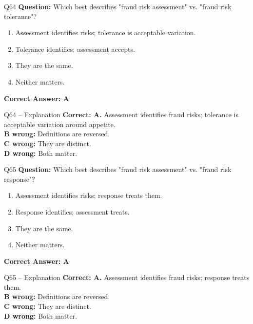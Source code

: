 \documentclass[aspectratio=169,10pt]{beamer}
\begin{document}
	\begin{frame}[t]{Q64}
		\small
		\textbf{Question:} Which best describes "fraud risk assessment" vs. "fraud risk tolerance"?
		\begin{enumerate}[label=\Alph*.,itemsep=1pt,topsep=2pt]
			\item Assessment identifies risks; tolerance is acceptable variation.
			\item Tolerance identifies; assessment accepts.
			\item They are the same.
			\item Neither matters.
		\end{enumerate}
		\vspace{4pt}
		\textbf{Correct Answer: A}
	\end{frame}
	
	\begin{frame}[t]{Q64 -- Explanation}
		\small
		\textbf{Correct: A.} Assessment identifies fraud risks; tolerance is acceptable variation around appetite. \\[4pt]
		\textbf{B wrong:} Definitions are reversed. \\[2pt]
		\textbf{C wrong:} They are distinct. \\[2pt]
		\textbf{D wrong:} Both matter.
	\end{frame}
	
	\begin{frame}[t]{Q65}
		\small
		\textbf{Question:} Which best describes "fraud risk assessment" vs. "fraud risk response"?
		\begin{enumerate}[label=\Alph*.,itemsep=1pt,topsep=2pt]
			\item Assessment identifies risks; response treats them.
			\item Response identifies; assessment treats.
			\item They are the same.
			\item Neither matters.
		\end{enumerate}
		\vspace{4pt}
		\textbf{Correct Answer: A}
	\end{frame}
	
	\begin{frame}[t]{Q65 -- Explanation}
		\small
		\textbf{Correct: A.} Assessment identifies fraud risks; response treats them. \\[4pt]
		\textbf{B wrong:} Definitions are reversed. \\[2pt]
		\textbf{C wrong:} They are distinct. \\[2pt]
		\textbf{D wrong:} Both matter.
	\end{frame}
	
\end{document}
